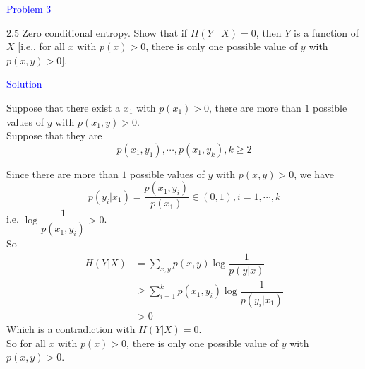 \textcolor{blue}{Problem 3}

2.5 Zero conditional entropy. Show that if $H(Y \mid X)=0$, then $Y$ is a function of $X$ [i.e., for all $x$ with $p(x)>0$, there is only one possible value of $y$ with $p(x, y)>0]$.

\textcolor{blue}{Solution}

Suppose that there exist a $x_1$ with $p(x_1)>0$, there are more than $1$ possible values of $y$ with $p(x_1, y)>0$. \\
Suppose that they are
$$p(x_1,y_1),\cdots,p(x_1,y_k), k\geq 2$$

Since there are more than $1$ possible values of $y$ with $p(x, y)>0$, we have
$$p(y_i|x_1)=\dfrac{p(x_1,y_i)}{p(x_1)}\in (0,1), i=1,\cdots,k$$
i.e. $\log\dfrac{1}{p(x_1,y_i)}>0$.\\
So
\begin{align*}
H(Y|X) &= \sum_{x,y}p(x,y)\log\dfrac{1}{p(y|x)} \\
&\geq \sum_{i=1}^k p(x_1,y_i)\log\dfrac{1}{p(y_i|x_1)} \\
&> 0
\end{align*}
Which is a contradiction with $H(Y|X)=0$.\\
So for all $x$ with $p(x)>0$, there is only one possible value of $y$ with $p(x, y)>0$.

\newpage